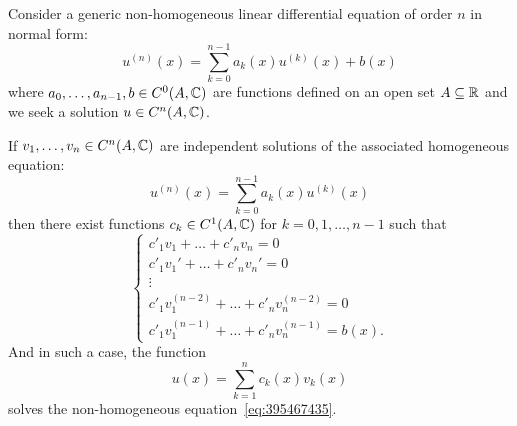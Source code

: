 \begin{theorem}
\mymark{***}%
Consider a generic non-homogeneous linear differential equation of order $n$ in
normal form:
\begin{equation}\label{eq:395467435}
  u^{(n)}(x) = \sum_{k=0}^{n-1} a_k(x) u^{(k)}(x) + b(x)
\end{equation}
where $a_0, \dots, a_{n-1}, b\in C^0(A,{\mathbb C})$ are functions defined on an open
set $A\subseteq {\mathbb R}$
and we seek a solution $u\in C^n(A,{\mathbb C})$.

If $v_1, \dots, v_n\in C^n(A,{\mathbb C})$ are independent solutions of the associated
homogeneous equation:
\begin{equation*}
  u^{(n)}(x) = \sum_{k=0}^{n-1} a_k(x) u^{(k)}(x)
\end{equation*}
then
there exist functions $c_k\in C^1(A,{\mathbb C})$
for $k=0,1, \dots, n-1$
such that
\begin{equation}\label{eq:02154676}
  \begin{cases}
    c'_1 v_1 + \dots + c'_n v_n = 0 \\
    c'_1 v_1' + \dots + c'_n v_n' = 0 \\
    \vdots\\
    c'_1 v_1^{(n-2)} + \dots + c'_n v_n^{(n-2)} = 0 \\
    c'_1 v_1^{(n-1)} + \dots + c'_n v_n^{(n-1)} = b(x).
  \end{cases}
\end{equation}
And in such a case, the function
\[
 u(x) = \sum_{k=1}^n c_k(x) v_k(x)
\]
solves the non-homogeneous equation~\eqref{eq:395467435}.
\end{theorem}
%

